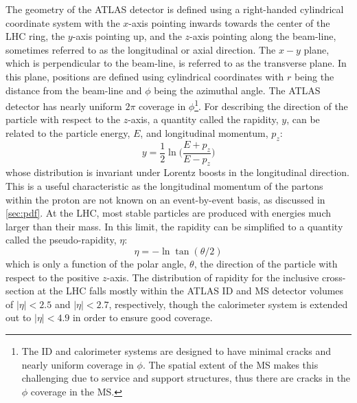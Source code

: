 The geometry of the ATLAS detector is defined using a 
right-handed cylindrical coordinate system with the $x$-axis
pointing inwards towards the center of the LHC ring, the $y$-axis pointing
up, and the $z$-axis pointing along the beam-line, sometimes referred
to as the longitudinal or axial direction.
The $x-y$ plane, which is perpendicular to the beam-line,
is referred to as the transverse plane. In this plane, positions are  
defined using cylindrical coordinates with $r$ being the distance
from the beam-line and $\phi$ being the azimuthal angle.
The ATLAS detector has nearly uniform $2\pi$ 
coverage in $\phi$\footnote{The ID and calorimeter systems are designed
to have minimal cracks and nearly uniform coverage in $\phi$. The
spatial extent of the MS makes this challenging due to service
and support structures, thus there are cracks in the $\phi$ coverage in the MS.}.
For describing the direction of the particle with respect 
to the $z$-axis, a quantity called the rapidity, $y$,
can be related to the particle energy, $E$, and longitudinal momentum, $p_z$:
\begin{equation}
y = \frac{1}{2} \ln \Bigg(\frac{E+p_z}{E-p_z} \Bigg)
\end{equation}
whose distribution is invariant under Lorentz boosts in the longitudinal direction.
This is a useful characteristic as the longitudinal momentum of the
partons within the proton are not known on an 
event-by-event basis, as discussed in \sec\ref{sec:pdf}.
At the LHC, most stable particles 
are produced with energies much larger than their mass.
In this limit, 
the rapidity can be simplified to a quantity called the pseudo-rapidity, $\eta$:
\begin{equation}
\eta = -\ln \tan (\theta/2) 
\label{eq:pseudorapidity}
\end{equation}
which is only a function of the polar angle, $\theta$, 
the direction of the particle with respect to the positive $z$-axis.
The distribution of rapidity for the inclusive cross-section
at the LHC falls mostly within the ATLAS ID and MS detector volumes 
of $|\eta| < 2.5$ and $|\eta| < 2.7$, respectively, 
though the calorimeter system is extended out to $|\eta| < 4.9$
in order to ensure good coverage.

